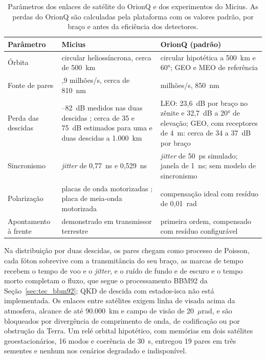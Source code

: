 \documentclass[12pt]{article}
\begin{document}
\begin{table}[ht]
\centering
\caption{Parâmetros dos enlaces de satélite do OrionQ e dos experimentos do
Micius. As perdas do OrionQ são calculadas pela plataforma com os valores padrão,
por braço e antes da eficiência dos detectores.}
\label{tab:micius}
\scriptsize
\begin{tabular}{>{\raggedright\arraybackslash}p{2.6cm}>{\raggedright\arraybackslash}p{5.1cm}>{\raggedright\arraybackslash}p{5.3cm}}
\toprule
Parâmetro & Micius & OrionQ (padrão) \\
\midrule
Órbita & circular heliossíncrona, cerca de 500~km \cite{yin2017,lu2022} & circular hipotética a 500~km e 60°; GEO e MEO de referência \\
Fonte de pares & 5,9 milhões/s, cerca de 810~nm \cite{yin2017} & 5 milhões/s, 850~nm \\
Perda das descidas & 64--82~dB medidos nas duas descidas \cite{yin2017}; cerca de 35 e 75~dB estimados para uma e duas descidas a 1.000~km \cite{lu2022} & LEO: 23,6~dB por braço no zênite e 32,7~dB a 20° de elevação; GEO, com receptores de 4~m: cerca de 34 a 37~dB por braço \\
Sincronismo & \textit{jitter} de 0,77~ns \cite{yin2017} e 0,529~ns \cite{liao2017} & \textit{jitter} de 50~ps simulado; janela de 1~ns; sem modelo de sincronismo \\
Polarização & placas de onda motorizadas \cite{yin2017}; placa de meia-onda motorizada \cite{liao2017,lu2022} & compensação ideal com resíduo de 0,01~rad \\
Apontamento à frente & demonstrado em transmissor terrestre \cite{han2018} & primeira ordem, compensado com resíduo configurável \\
\bottomrule
\end{tabular}
\end{table}

Na distribuição por duas descidas, os pares chegam como processo de Poisson,
cada fóton sobrevive com a transmitância do seu braço, as marcas de tempo
recebem o tempo de voo e o \textit{jitter}, e o ruído de fundo e de escuro e o
tempo morto completam o fluxo, que segue o processamento BBM92 da
Seção~\ref{sec:tec_bbm92}; QKD de descida com estados-isca não está
implementada. Os enlaces entre satélites exigem linha de visada acima da
atmosfera, alcance de até 90.000~km e campo de visão de 20~$\mu$rad, e são
bloqueados por divergência de comprimento de onda, de codificação ou por
obstrução da Terra. Um relé orbital hipotético, com memórias em dois satélites
geoestacionários, 16 modos e coerência de 30~s, entregou 19 pares em três
sementes e nenhum nos cenários degradado e indisponível.
\end{document}
